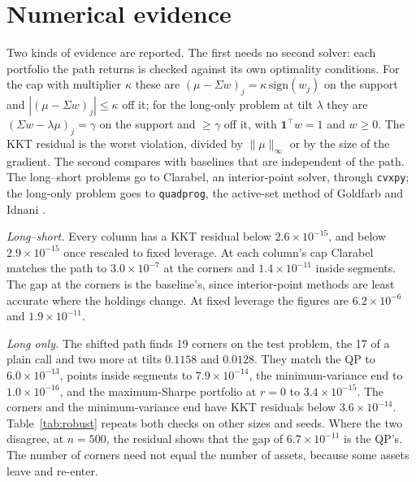 \documentclass[11pt]{article}
\newcommand{\trans}{^{\top}}
\newcommand{\Sig}{\Sigma}
\begin{document}
\section{Numerical evidence}
\label{sec:evidence}

Two kinds of evidence are reported. The first needs no second solver: each portfolio
the path returns is checked against its own optimality conditions. For the cap with
multiplier $\kappa$ these are $(\mu-\Sig w)_j=\kappa\,\mathrm{sign}(w_j)$ on the support
and $|(\mu-\Sig w)_j|\le\kappa$ off it; for the long-only problem at tilt $\lambda$ they are
$(\Sig w-\lambda\mu)_j=\gamma$ on the support and $\ge\gamma$ off it, with
$\mathbf 1\trans w=1$ and $w\ge0$. The KKT residual is the worst violation, divided by
$\|\mu\|_\infty$ or by the size of the gradient. The second compares with baselines that
are independent of the path. The long--short problems go to Clarabel, an interior-point
solver, through \texttt{cvxpy}; the long-only problem goes to \texttt{quadprog}, the
active-set method of Goldfarb and Idnani \cite{goldfarb1983}.

\emph{Long--short.} Every column has a KKT residual below $2.6\times10^{-15}$, and
below $2.9\times10^{-15}$ once rescaled to fixed leverage. At each column's cap Clarabel matches the path to
$3.0\times10^{-7}$ at the corners and $1.4\times10^{-11}$ inside segments. The gap at the
corners is the baseline's, since interior-point methods are least accurate where the
holdings change. At fixed leverage the figures are $6.2\times10^{-6}$ and
$1.9\times10^{-11}$.

\emph{Long only.} The shifted path finds 19 corners on the test problem, the 17 of a
plain call and two more at tilts $0.1158$ and $0.0128$. They match the QP to
$6.0\times10^{-13}$, points inside segments to $7.9\times10^{-14}$, the
minimum-variance end to $1.0\times10^{-16}$, and the maximum-Sharpe portfolio at $r=0$
to $3.4\times10^{-15}$. The corners and the minimum-variance end have KKT residuals below
$3.6\times10^{-14}$. Table~\ref{tab:robust} repeats both checks on other sizes and seeds.
Where the two disagree, at $n=500$, the residual shows that the gap of
$6.7\times10^{-11}$ is the QP's.
The number of corners need not equal the number of assets, because some assets leave
and re-enter.
\end{document}
